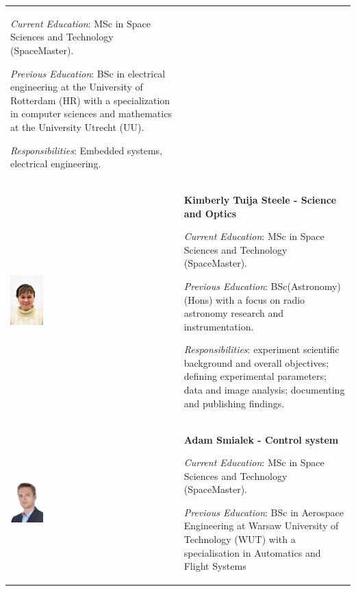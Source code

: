 \begin{longtable}[]{m{} m{}}
\smallskip
\textit{Current Education}: MSc in Space Sciences and Technology (SpaceMaster).

\smallskip
\textit{Previous Education}: BSc in electrical engineering at the University of Rotterdam (HR) with a specialization in computer sciences and mathematics at the University Utrecht (UU).

\smallskip
\textit{Responsibilities}: Embedded systems, electrical engineering.
\bigskip
\\

\includegraphics[width=0.2\textwidth]{0-cover/img/TEAMPICS/Kim_Final.jpg}  & \textbf{Kimberly Tuija Steele - Science and Optics}

\smallskip
\textit{Current Education}: MSc in Space Sciences and Technology (SpaceMaster).

\smallskip
\textit{Previous Education}: BSc(Astronomy)(Hons) with a focus on radio astronomy research and instrumentation.

\smallskip
\textit{Responsibilities}: experiment scientific background and overall objectives; defining experimental parameters; data and image analysis; documenting and publishing findings.

\bigskip
\\

\includegraphics[width=0.2\textwidth]{0-cover/img/TEAMPICS/Adam_final.jpg}  & \textbf{Adam Smialek - Control system}

\smallskip
\textit{Current Education}: MSc in Space Sciences and Technology (SpaceMaster).

\smallskip
\textit{Previous Education}: BSc in Aerospace Engineering at Warsaw University of Technology (WUT) with a specialisation in Automatics and Flight Systems


\end{longtable}
